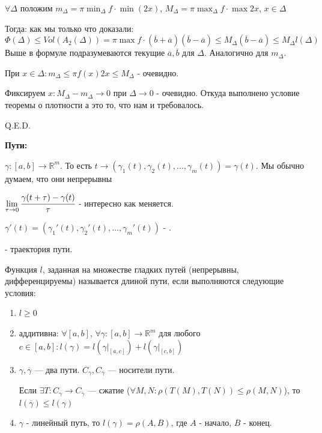 $\forall \Delta$ положим $m_{\Delta} = \pi \min_{\Delta
}f \cdot \min(2x) $, $M_{\Delta} = \pi \max_{\Delta} f \cdot \max 2x$, $x\in \Delta$ 

Тогда: как мы только что доказали: $$\varPhi(\Delta)\leq Vol(A_2(\Delta)) = \pi \max f \cdot (\overline{b}+\overline{a})(\overline{b}-\overline{a})\leq M_{\Delta}(\overline{b}-\overline{a})\leq M_{\Delta}l(\Delta)$$
Выше в формуле подразумеваются текущие $\overline{a},\overline{b}$ для $\Delta$. Аналогично для $m_{\Delta}$.

При $x \in \Delta: m_{\Delta}\leq \pi f(x)2x\leq M_{\Delta}$ - очевидно.

Фиксируем $x: M_{\Delta}-m_{\Delta}\rightarrow 0 $ при $\Delta \rightarrow0$ - очевидно. Откуда выполнено условие теоремы о плотности а это то, что нам и требовалось.

\hfill Q.E.D.

\textbf{Пути:}

$\gamma :[a,b] \rightarrow \mathbb{R}^m$. То есть $t\rightarrow (\gamma_1(t),\gamma_2(t),\ldots,\gamma_m(t)) = \gamma(t)$. Мы обычно думаем, что они непрерывны

$\lim\limits_{\tau \rightarrow 0} \cfrac{\gamma(t + \tau )-\gamma(t)}{\tau}$ - интересно как меняется.

$\gamma'(t) = (\gamma_1'(t),\gamma_2'(t),\ldots,\gamma_m'(t))$ - .

 - траектория пути.

 Функция $l$, заданная на множестве гладких путей (непрерывны, дифференцируемы) называется длиной пути, если выполняются следующие условия:

\begin{enumerate}
    \item $l\geq 0$
    \item аддитивна: $\forall [a,b]$, $\forall \gamma:[a,b]\rightarrow\mathbb{R}^m$ для любого $c\in [a,b]: l(\gamma) = l(\gamma\Big|_{[a,c]}) + l(\gamma\Big|_{[c,b]})$
    \item $\gamma, \overline{\gamma}$ --- два пути. $C_{\gamma},C_{\overline{\gamma}}$ --- носители пути.
    
    Если $\exists T: C_{\gamma} \rightarrow C_{\overline{\gamma}}$ --- сжатие ($\forall M,N:\rho(T(M), T(N))\leq \rho(M,N)$), то $l(\overline{\gamma})\leq l(\gamma)$
    \item $\gamma$ - линейный путь, то $l(\gamma) = \rho(A,B)$, где $A$ - начало, $B$ - конец.
\end{enumerate}

